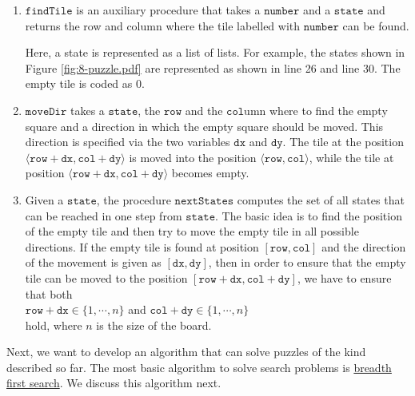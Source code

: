 \begin{enumerate}
\item $\mathtt{findTile}$ is an auxiliary procedure that takes a $\mathtt{number}$ and a $\mathtt{state}$ and
      returns the row and column where the tile labelled with $\mathtt{number}$ can be found.  

      Here, a state is represented as a list of lists.  For example, the states shown in Figure
      \ref{fig:8-puzzle.pdf} are represented as shown in line 26 and line 30.  The empty tile is
      coded as $0$. 
\item $\mathtt{moveDir}$ takes a $\mathtt{state}$, the $\mathtt{row}$ and the $\mathtt{col}$umn
      where to find the empty square and a direction in which the empty square should be moved.
      This direction is specified via the two variables $\mathtt{dx}$ and $\mathtt{dy}$.  The tile
      at the position $\langle\mathtt{row} + \mathtt{dx}, \mathtt{col} + \mathtt{dy}\rangle$ is
      moved into the position $\langle\mathtt{row}, \mathtt{col}\rangle$, while the tile at position
      $\langle\mathtt{row} + \mathtt{dx}, \mathtt{col} + \mathtt{dy}\rangle$ becomes empty.
\item Given a $\mathtt{state}$, the procedure $\mathtt{nextStates}$ computes the set of all states
      that can be reached in one step from $\mathtt{state}$.  The basic idea is to find the position of the
      empty tile and then try to move the empty tile in all possible directions.  If the empty tile is found at
      position $[\mathtt{row}, \mathtt{col}]$ and the direction of the movement is given as $[\mathtt{dx}, \mathtt{dy}]$, then
      in order to ensure that the empty tile can be moved to the position $[\mathtt{row}+\mathtt{dx}, \mathtt{col}+\mathtt{dy}]$,
      we have to ensure that both
      \\[0.2cm]
      \hspace*{1.3cm}
      $\mathtt{row}+\mathtt{dx} \in \{1,\cdots,n\}$ \quad and \quad
      $\mathtt{col}+\mathtt{dy} \in \{1,\cdots,n\}$
      \\[0.2cm]
      hold, where $n$ is the size of the board.
\end{enumerate}

Next, we want to develop an algorithm that can solve puzzles of the kind described so far.  The most basic
algorithm to solve search problems is \href{https://en.wikipedia.org/wiki/Breadth-first_search}{breadth first search}. 
We discuss this algorithm next.

